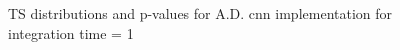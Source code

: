 \begin{figure}
    \centering
    
    
    \caption{TS distributions and p-values for A.D. cnn implementation for integration time = 1}
    \label{fig:ts-distribution-and-p-values-cnn-it-1}
\end{figure}

